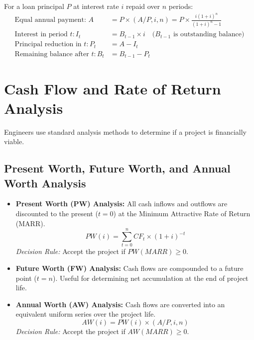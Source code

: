 \documentclass[12pt,a4paper]{article}
\begin{document}
\begin{tcolorbox}[formulabox, title={\textbf{Loan Amortization Equations}}]
For a loan principal $P$ at interest rate $i$ repaid over $n$ periods:
\begin{align}
  \text{Equal annual payment: } A &= P \times (A/P, i, n) = P \times \frac{i(1+i)^n}{(1+i)^n - 1} \\[6pt]
  \text{Interest in period } t: I_t &= B_{t-1} \times i \quad \text{($B_{t-1}$ is outstanding balance)} \\[4pt]
  \text{Principal reduction in } t: P_t &= A - I_t \\[4pt]
  \text{Remaining balance after } t: B_t &= B_{t-1} - P_t
\end{align}
\end{tcolorbox}

\section{Cash Flow and Rate of Return Analysis}

Engineers use standard analysis methods to determine if a project is financially viable.

\subsection{Present Worth, Future Worth, and Annual Worth Analysis}
\begin{itemize}[leftmargin=*, itemsep=6pt]
  \item \textbf{Present Worth (PW) Analysis:} All cash inflows and outflows are discounted to the present ($t=0$) at the Minimum Attractive Rate of Return (MARR).
    \begin{equation}
      PW(i) = \sum_{t=0}^{n} CF_t \times (1 + i)^{-t}
    \end{equation}
    \textit{Decision Rule:} Accept the project if $PW(MARR) \ge 0$.
  \item \textbf{Future Worth (FW) Analysis:} Cash flows are compounded to a future point ($t=n$). Useful for determining net accumulation at the end of project life.
  \item \textbf{Annual Worth (AW) Analysis:} Cash flows are converted into an equivalent uniform series over the project life.
    \begin{equation}
      AW(i) = PW(i) \times (A/P, i, n)
    \end{equation}
    \textit{Decision Rule:} Accept the project if $AW(MARR) \ge 0$.
\end{itemize}
\end{document}
